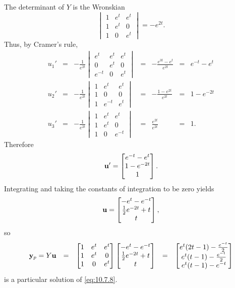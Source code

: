 \documentclass{ximera}
\begin{document}
\begin{example}
\begin{explanation}
$$$$
The determinant of $Y$  is the Wronskian
$$
\begin{vmatrix}1&e^t&e^t\\1&e^t&0\\1&0&e^t\end{vmatrix}
=-e^{2t}.
$$
Thus, by Cramer's rule,
$$
\begin{array}{cccccll}
u_1'&=&-\frac{1}{e^{2t}}\begin{vmatrix}e^t&e^t&e^t\\0&e^t&0\\e^{-t}&0&e^t
\end{vmatrix}&=&-\frac{e^{3t}-e^t}{e^{2t}}&=&e^{-t}-e^t\\ u_2'&=&-\frac{1}{e^{2t}}\begin{vmatrix}1&e^t&e^t\\1&0&0\\1&e^{-t}&e^t
\end{vmatrix}&=&-\frac{1-e^{2t}}{e^{2t}}&=&1-e^{-2t}\\
u_3'&=&-\frac{1}{e^{2t}}\begin{vmatrix}1&e^t&e^t\\1&e^t&0\\1&0&e^{-t}
\end{vmatrix}&=&\frac{e^{2t}}{e^{2t}}&=&1.
\end{array}
$$
 Therefore
$$
{\bf u}'=\begin{bmatrix}e^{-t}-e^t\\1-e^{-2t}\\1\end{bmatrix}.
$$
Integrating and taking the constants of integration to be zero yields
$$
{\bf
u}=\begin{bmatrix}-e^t-e^{-t}\\\frac{1}{2}e^{-2t}+t
\\t\end{bmatrix},
$$
so
$$
\begin{array}{ccccl}
{\bf y}_p=Y{\bf u}&=&
\begin{bmatrix}1&e^t&e^t\\1&e^t&0\\1&0&e^t\end{bmatrix}
\begin{bmatrix}-e^t-e^{-t}\\\frac{1}{2}e^{-2t}+t\\t\end{bmatrix}
&=&\begin{bmatrix}e^t(2t-1)-\frac{e^{-t}}{2}\\
e^t(t-1)-\frac{e^{-t}}{2}\\
e^t(t-1)-e^{-t}
\end{bmatrix}
\end{array}
$$
is a particular solution of  \eqref{eq:10.7.8}.


\end{explanation}
\end{example}
\end{document}
